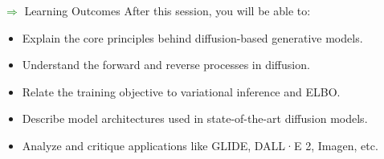\begin{frame}[allowframebreaks]{\textcolor{green}{$\Rightarrow$} Learning Outcomes}
    After this session, you will be able to:
    \begin{itemize}
        \item Explain the core principles behind diffusion-based generative models.
        \item Understand the forward and reverse processes in diffusion.
        \item Relate the training objective to variational inference and ELBO.
        \item Describe model architectures used in state-of-the-art diffusion models.
        \item Analyze and critique applications like GLIDE, DALL·E 2, Imagen, etc.
    \end{itemize}
\end{frame}
